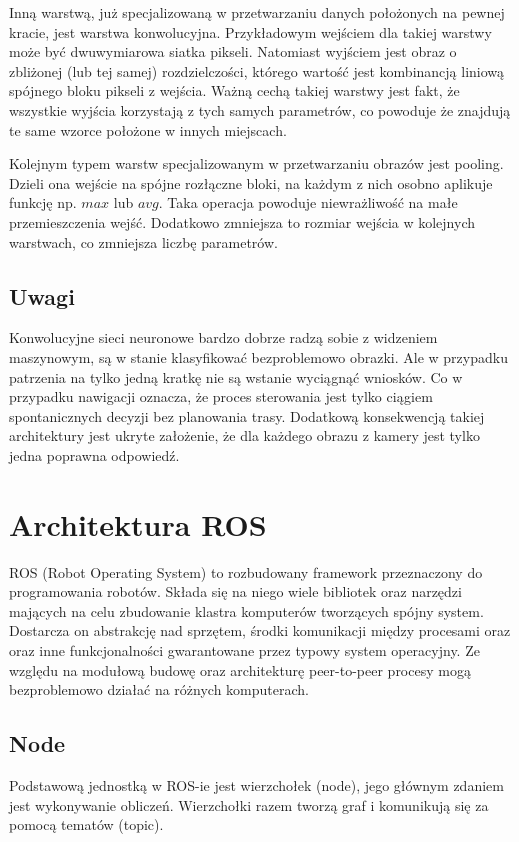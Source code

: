 Inną warstwą, już specjalizowaną w przetwarzaniu danych położonych na pewnej kracie,
jest warstwa konwolucyjna. Przykładowym wejściem dla takiej warstwy może być
dwuwymiarowa siatka pikseli. Natomiast wyjściem jest obraz o zbliżonej (lub tej samej)
rozdzielczości, którego wartość jest kombinancją liniową spójnego bloku pikseli z 
wejścia. Ważną cechą takiej warstwy jest fakt, że wszystkie wyjścia korzystają
z tych samych parametrów, co powoduje że znajdują te same wzorce położone w 
innych miejscach.

Kolejnym typem warstw specjalizowanym w przetwarzaniu obrazów jest pooling.
Dzieli ona wejście na spójne rozłączne bloki, na każdym z nich osobno aplikuje
funkcję np. $max$ lub $avg$. Taka operacja powoduje niewrażliwość na małe 
przemieszczenia wejść. Dodatkowo zmniejsza to rozmiar wejścia w kolejnych warstwach,
co zmniejsza liczbę parametrów.
\subsection{Uwagi}
Konwolucyjne sieci neuronowe bardzo dobrze radzą sobie z widzeniem maszynowym, są w stanie
klasyfikować bezproblemowo obrazki\cite{cnn}.
Ale w przypadku patrzenia na tylko jedną kratkę nie są wstanie wyciągnąć wniosków.
Co w przypadku nawigacji oznacza, że proces sterowania jest tylko ciągiem
spontanicznych decyzji bez planowania trasy. Dodatkową konsekwencją takiej architektury
jest ukryte założenie, że dla każdego obrazu z kamery jest tylko jedna poprawna
odpowiedź.


\section{Architektura ROS}
ROS (Robot Operating System) to rozbudowany framework przeznaczony do programowania robotów.
Składa się na niego wiele bibliotek oraz narzędzi mających na celu zbudowanie
klastra komputerów tworzących spójny system.
Dostarcza on abstrakcję nad sprzętem, środki komunikacji między procesami oraz
oraz inne funkcjonalności gwarantowane przez typowy system operacyjny.
Ze względu na modułową budowę oraz architekturę peer-to-peer procesy mogą
bezproblemowo działać na różnych komputerach.
\subsection{Node}
Podstawową jednostką w ROS-ie jest wierzchołek (node), jego głównym zdaniem jest
wykonywanie obliczeń. Wierzchołki razem tworzą graf i komunikują się za 
pomocą tematów (topic).

